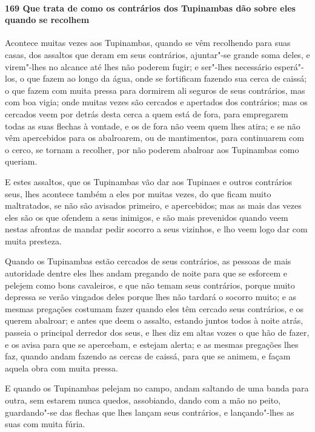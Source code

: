 \paragraph{169 Que trata de como os contrários dos Tupinambas dão sobre eles quando se
recolhem}

Acontece muitas vezes aos Tupinambas, quando se vêm recolhendo para suas casas, dos
assaltos que deram em seus contrários, ajuntar"-se grande soma deles, e virem"-lhes no
alcance até lhes não poderem fugir; e ser"-lhes necessário esperá"-los, o que fazem ao longo
da água, onde se fortificam fazendo sua cerca de caissá; o que fazem com muita pressa para
dormirem ali seguros de seus contrários, mas com boa vigia; onde muitas vezes são cercados
e apertados dos contrários; mas os cercados veem por detrás desta cerca a quem está de
fora, para empregarem todas as suas flechas à vontade, e os de fora não veem quem lhes
atira; e se não vêm apercebidos para os abalroarem, ou de mantimentos, para continuarem
com o cerco, se tornam a recolher, por não poderem abalroar aos Tupinambas como queriam.

E estes assaltos, que os Tupinambas vão dar aos Tupinaes e outros contrários seus, lhes
acontece também a eles por muitas vezes, do que ficam muito maltratados, se não são
avisados primeiro, e apercebidos; mas as mais das vezes eles são os que ofendem a seus
inimigos, e são mais prevenidos quando veem nestas afrontas de mandar pedir socorro a seus
vizinhos, e lho veem logo dar com muita presteza.

Quando os Tupinambas estão cercados de seus contrários, as pessoas de mais autoridade
dentre eles lhes andam pregando de noite para que se esforcem e pelejem como bons
cavaleiros, e que não temam seus contrários, porque muito depressa se verão vingados deles
porque lhes não tardará o socorro muito; e as mesmas pregações costumam fazer quando eles
têm cercado seus contrários, e os querem abalroar; e antes que deem o assalto, estando
juntos todos à noite atrás, passeia o principal derredor dos seus, e lhes diz em altas
vozes o que hão de fazer, e os avisa para que se apercebam, e estejam alerta; e as mesmas
pregações lhes faz, quando andam fazendo as cercas de caissá, para que se animem, e façam
aquela obra com muita pressa.

E quando os Tupinambas pelejam no campo, andam saltando de uma banda para outra, sem
estarem nunca quedos, assobiando, dando com a mão no peito, guardando"-se das flechas que
lhes lançam seus contrários, e lançando"-lhes as suas com muita fúria.

